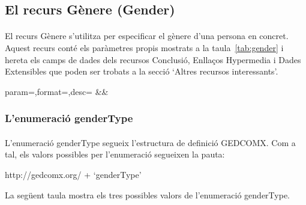 \subsection{El recurs Gènere (Gender)}

    \paragraph{}
    El recurs Gènere s'utilitza per especificar el gènere d'una persona en concret. Aquest recurs conté els paràmetres propis mostrats a la taula~\ref{tab:gender} i hereta els camps de dades dels recursos Conclusió, Enllaços Hypermedia i Dades Extensibles que poden ser trobats a la secció `Altres recursos interessants'.

    \begin{center}
             {param=\param,format=\format,desc=\desc}
             {\param&\format&\desc}
     \end{center}


     \subsubsection{L'enumeració genderType}

     \paragraph{}
     L'enumeració genderType segueix l'estructura de definició GEDCOMX. Com a tal, els valors possibles per l'enumeració segueixen la pauta:

     http://gedcomx.org/ + `genderType'

     La següent taula mostra els tres possibles valors de l'enumeració genderType.

